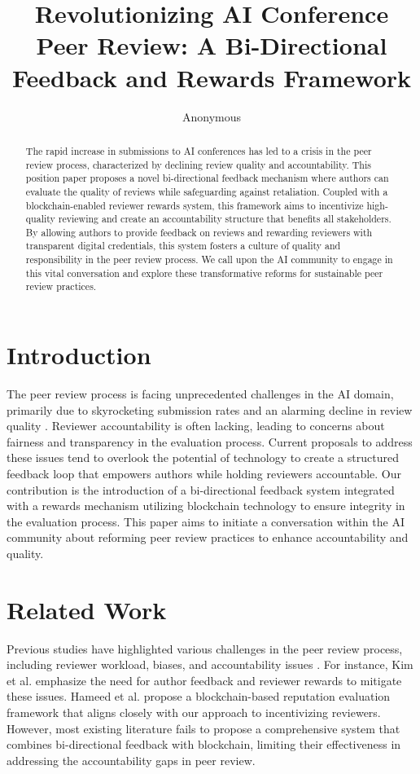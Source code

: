 \documentclass{article} %
\title{
Revolutionizing AI Conference Peer Review: A Bi-Directional Feedback and Rewards Framework
}
\author{Anonymous}
\begin{document}
\maketitle

\begin{abstract}
The rapid increase in submissions to AI conferences has led to a crisis in the peer review process, characterized by declining review quality and accountability. This position paper proposes a novel bi-directional feedback mechanism where authors can evaluate the quality of reviews while safeguarding against retaliation. Coupled with a blockchain-enabled reviewer rewards system, this framework aims to incentivize high-quality reviewing and create an accountability structure that benefits all stakeholders. By allowing authors to provide feedback on reviews and rewarding reviewers with transparent digital credentials, this system fosters a culture of quality and responsibility in the peer review process. We call upon the AI community to engage in this vital conversation and explore these transformative reforms for sustainable peer review practices.
\end{abstract}

\section{Introduction}
\label{sec:intro}
The peer review process is facing unprecedented challenges in the AI domain, primarily due to skyrocketing submission rates and an alarming decline in review quality \cite{kim2025positionta}. Reviewer accountability is often lacking, leading to concerns about fairness and transparency in the evaluation process. Current proposals to address these issues tend to overlook the potential of technology to create a structured feedback loop that empowers authors while holding reviewers accountable. Our contribution is the introduction of a bi-directional feedback system integrated with a rewards mechanism utilizing blockchain technology to ensure integrity in the evaluation process. This paper aims to initiate a conversation within the AI community about reforming peer review practices to enhance accountability and quality.

\section{Related Work}
\label{sec:related}
Previous studies have highlighted various challenges in the peer review process, including reviewer workload, biases, and accountability issues \cite{seghier2024aipoweredpr, xu2025canli}. For instance, Kim et al. \cite{kim2025positionta} emphasize the need for author feedback and reviewer rewards to mitigate these issues. Hameed et al. \cite{hameed2025blockchainintegratedre} propose a blockchain-based reputation evaluation framework that aligns closely with our approach to incentivizing reviewers. However, most existing literature fails to propose a comprehensive system that combines bi-directional feedback with blockchain, limiting their effectiveness in addressing the accountability gaps in peer review.
\end{document}
